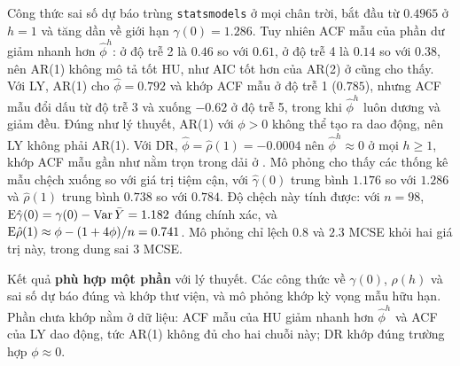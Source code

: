  Công thức sai số dự báo trùng \texttt{statsmodels} ở mọi chân trời, bắt đầu từ $0.4965$ ở $h=1$ và tăng dần về giới hạn $\gamma(0)=1.286$. Tuy nhiên ACF mẫu của phần dư giảm nhanh hơn $\hat\phi^h$: ở độ trễ 2 là $0.46$ so với $0.61$, ở độ trễ 4 là $0.14$ so với $0.38$, nên AR(1) không mô tả tốt HU, như AIC tốt hơn của AR(2) ở  cũng cho thấy. Với LY, AR(1) cho $\hat\phi=0.792$ và khớp ACF mẫu ở độ trễ 1 ($0.785$), nhưng ACF mẫu đổi dấu từ độ trễ 3 và xuống $-0.62$ ở độ trễ 5, trong khi $\hat\phi^h$ luôn dương và giảm đều. Đúng như lý thuyết, AR(1) với $\phi>0$ không thể tạo ra dao động, nên LY không phải AR(1). Với DR, $\hat\phi=\hat\rho(1)=-0.0004$ nên $\hat\phi^h\approx0$ ở mọi $h\ge1$, khớp ACF mẫu gần như nằm trọn trong dải ở . Mô phỏng cho thấy các thống kê mẫu chệch xuống so với giá trị tiệm cận, với $\hat\gamma(0)$ trung bình $1.176$ so với $1.286$ và $\hat\rho(1)$ trung bình $0.738$ so với $0.784$. Độ chệch này tính được: với $n=98$, $\mathrm{E}\hat\gamma(0)=\gamma(0)-\operatorname{Var}\bar Y=1.182$ đúng chính xác, và $\mathrm{E}\hat\rho(1)\approx\phi-(1+4\phi)/n=0.741$. Mô phỏng chỉ lệch $0.8$ và $2.3$ MCSE khỏi hai giá trị này, trong dung sai $3$ MCSE.

 Kết quả \textbf{phù hợp một phần} với lý thuyết. Các công thức về $\gamma(0)$, $\rho(h)$ và sai số dự báo đúng và khớp thư viện, và mô phỏng khớp kỳ vọng mẫu hữu hạn. Phần chưa khớp nằm ở dữ liệu: ACF mẫu của HU giảm nhanh hơn $\hat\phi^h$ và ACF của LY dao động, tức AR(1) không đủ cho hai chuỗi này; DR khớp đúng trường hợp $\phi\approx0$.

